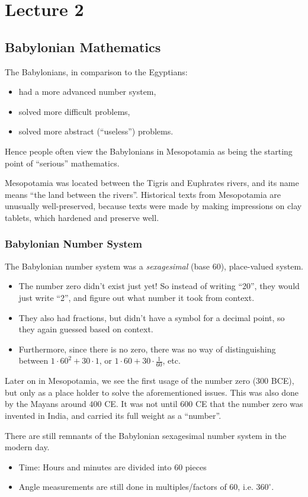 \documentclass[class=article, crop=false]{standalone}
\begin{document}
  \section{Lecture 2}
  \subsection{Babylonian Mathematics}
  The Babylonians, in comparison to the Egyptians:
  \begin{itemize}
    \item had a more advanced number system,
    \item solved more difficult problems,
    \item solved more abstract (``useless'') problems.
  \end{itemize}
  Hence people often view the Babylonians in Mesopotamia as being the starting point of ``serious'' mathematics. \par
  Mesopotamia was located between the Tigris and Euphrates rivers, and its name means ``the land between the rivers''. Historical texts from Mesopotamia are unusually well-preserved, because texts were made by making impressions on clay tablets, which hardened and preserve well.
  \subsubsection{Babylonian Number System}
  The Babylonian number system was a \emph{sexagesimal} (base 60), place-valued system.
  \begin{note}{}
    \begin{itemize}
      \item The number zero didn't exist just yet! So instead of writing ``20'', they would just write ``2'', and figure out what number it took from context.
      \item They also had fractions, but didn't have a symbol for a decimal point, so they again guessed based on context.
      \item Furthermore, since there is no zero, there was no way of distinguishing between $1\cdot 60^2 + 30\cdot 1$, or $1\cdot 60 + 30\cdot \frac{1}{60}$, etc.
    \end{itemize}
  \end{note}
  Later on in Mesopotamia, we see the first usage of the number zero (300 BCE), but only as a place holder to solve the aforementioned issues. This was also done by the Mayans around $400$ CE. It was not until $600$ CE that the number zero was invented in India, and carried its full weight as a ``number''.
  \begin{note}{}
    There are still remnants of the Babylonian sexagesimal number system in the modern day.
    \begin{itemize}
      \item Time: Hours and minutes are divided into $60$ pieces
      \item Angle measurements are still done in multiples/factors of $60$, i.e. $360^\circ$.
    \end{itemize}
  \end{note}
\end{document}
